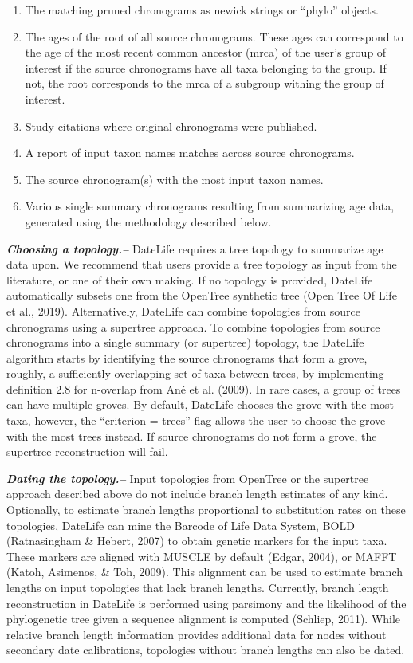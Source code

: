 \documentclass[
  english,
  man]{apa6}
\providecommand{\tightlist}{%
  \setlength{\itemsep}{0pt}\setlength{\parskip}{0pt}}
\begin{document}
\begin{enumerate}
\def\labelenumi{\arabic{enumi}.}
\tightlist
\item
  The matching pruned chronograms as newick strings or ``phylo'' objects.
\item
  The ages of the root of all source chronograms. These ages can correspond to the age of the most recent common ancestor (mrca) of the user's group of interest if the source chronograms have all taxa belonging to the group. If not, the root corresponds to the mrca of a subgroup withing the group of interest.
\item
  Study citations where original chronograms were published.
\item
  A report of input taxon names matches across source chronograms.
\item
  The source chronogram(s) with the most input taxon names.
\item
  Various single summary chronograms resulting from summarizing age data, generated using the methodology described below.
\end{enumerate}

\emph{\textbf{Choosing a topology.--}}
DateLife requires a tree topology to summarize age data upon.
We recommend that users provide a tree topology as input from the literature, or one of their own making. If no topology is provided, DateLife automatically subsets one from the OpenTree synthetic tree (Open Tree Of Life et al., 2019).
Alternatively, DateLife can combine topologies from source chronograms using a supertree approach.
To combine topologies from source chronograms into a single summary (or supertree) topology, the DateLife algorithm starts by identifying the source chronograms that form a grove, roughly, a sufficiently overlapping set of taxa between trees, by implementing definition 2.8 for n-overlap from Ané et al. (2009). In rare cases, a group of trees can have multiple groves. By default, DateLife chooses the grove with the most taxa, however, the ``criterion = trees'' flag allows the user to choose the grove with the most trees instead.
If source chronograms do not form a grove, the supertree reconstruction will fail.

\emph{\textbf{Dating the topology.--}}
Input topologies from OpenTree or the supertree approach described above do not include branch length estimates of any kind.
Optionally, to estimate branch lengths proportional to substitution rates on these topologies, DateLife can mine the Barcode of Life Data System, BOLD (Ratnasingham \& Hebert, 2007) to obtain genetic markers for the input taxa.
These markers are aligned with MUSCLE by default (Edgar, 2004), or MAFFT (Katoh, Asimenos, \& Toh, 2009).
This alignment can be used to estimate branch lengths on input topologies that lack branch lengths.
Currently, branch length reconstruction in DateLife is performed using parsimony and the likelihood of the phylogenetic tree given a sequence alignment is computed (Schliep, 2011).
While relative branch length information provides additional data for nodes without secondary date calibrations, topologies without branch lengths can also be dated.
\end{document}
